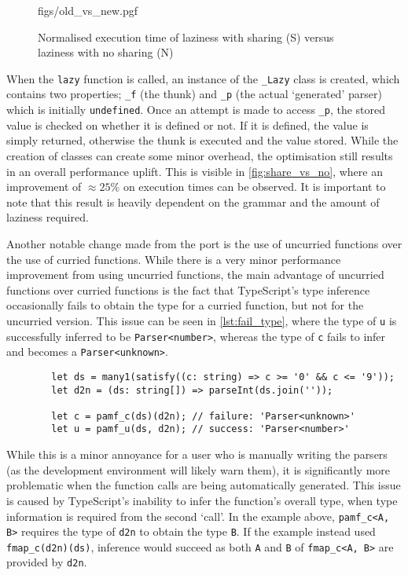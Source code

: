 \begin{figure}[H]
    \centering
    {figs/old_vs_new.pgf}
    \vspace{-0.5\baselineskip}
    \caption{Normalised execution time of laziness with sharing (S) versus laziness with no sharing (N)}
    \label{fig:share_vs_no}
\end{figure}

When the \texttt{lazy} function is called, an instance of the \texttt{\_Lazy} class is created, which contains two properties; \texttt{\_f} (the thunk) and \texttt{\_p} (the actual `generated' parser) which is initially \texttt{undefined}.
Once an attempt is made to access \texttt{\_p}, the stored value is checked on whether it is defined or not.
If it is defined, the value is simply returned, otherwise the thunk is executed and the value stored.
While the creation of classes can create some minor overhead, the optimisation still results in an overall performance uplift.
This is visible in \autoref{fig:share_vs_no}, where an improvement of $\approx 25\%$ on execution times can be observed.
It is important to note that this result is heavily dependent on the grammar and the amount of laziness required.

Another notable change made from the port is the use of uncurried functions over the use of curried functions.
While there is a very minor performance improvement from using uncurried functions, the main advantage of uncurried functions over curried functions is the fact that TypeScript's type inference occasionally fails to obtain the type for a curried function, but not for the uncurried version.
This issue can be seen in \autoref{lst:fail_type}, where the type of \texttt{u} is successfully inferred to be \texttt{Parser<number>}, whereas the type of \texttt{c} fails to infer and becomes a \texttt{Parser<unknown>}.

\begin{capminted}
    \begin{verbatim}
        let ds = many1(satisfy((c: string) => c >= '0' && c <= '9'));
        let d2n = (ds: string[]) => parseInt(ds.join(''));

        let c = pamf_c(ds)(d2n); // failure: 'Parser<unknown>'
        let u = pamf_u(ds, d2n); // success: 'Parser<number>'
    \end{verbatim}
    \vspace{-0.5\baselineskip}
    \caption{Example of failed type inference on a simple natural number parser}
    \label{lst:fail_type}
\end{capminted}

While this is a minor annoyance for a user who is manually writing the parsers (as the development environment will likely warn them), it is significantly more problematic when the function calls are being automatically generated.
This issue is caused by TypeScript's inability to infer the function's overall type, when type information is required from the second `call'.
In the example above, \texttt{pamf\_c<A, B>} requires the type of \texttt{d2n} to obtain the type \texttt{B}.
If the example instead used \texttt{fmap\_c(d2n)(ds)}, inference would succeed as both \texttt{A} and \texttt{B} of \texttt{fmap\_c<A, B>} are provided by \texttt{d2n}.
